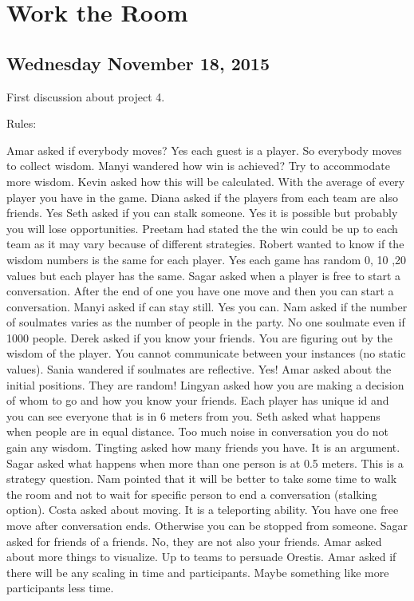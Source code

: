 \section{Work the Room}
\subsection{Wednesday November 18, 2015}
First discussion about project 4.

Rules:

Amar asked if everybody moves? Yes each guest is a player. So everybody moves to 
collect wisdom.
Manyi wandered how win is achieved? Try to accommodate more wisdom.
Kevin asked how this will be calculated. With the average of every player you 
have in the game.
Diana asked if the players from each team are also friends. Yes
Seth asked if you can stalk someone. Yes it is possible but probably you will 
lose opportunities.
Preetam had stated the the win could be up to each team as it may vary because 
of different strategies.
Robert wanted to know if the wisdom numbers is the same for each player. Yes each 
game has random {0, 10 ,20} values but each player has the same.
Sagar asked when a player is free to start a conversation. After the end of one 
you have one move and then you can start a conversation.
Manyi asked if can stay still. Yes you can.
Nam asked if the number of soulmates varies as the number of people in the party. 
No one soulmate even if 1000 people.
Derek asked if you know your friends. You are figuring out by the wisdom of the 
player. You cannot communicate between your instances (no static values). 
Sania wandered if soulmates are reflective. Yes!
Amar asked about the initial positions. They are random!
Lingyan asked how you are making a decision of whom to go and how you know your 
friends.
Each player has unique id and you can see everyone that is in 6 meters from you.
Seth asked what happens when people are in equal distance. Too much noise in 
conversation you do not gain any wisdom. 
Tingting asked how many friends you have. It is an argument.
Sagar asked what happens when more than one person is at 0.5 meters. This is a 
strategy question.
Nam pointed that it will be better to take some time to walk the room and not to 
wait for specific person to end a conversation (stalking option).
Costa asked about moving. It is a teleporting ability. You have one free move 
after conversation ends. Otherwise you can be stopped from someone. 
Sagar asked for friends of a friends. No, they are not also your friends.
Amar asked about more things to visualize. Up to teams to persuade Orestis.
Amar asked if there will be any scaling in time and participants. Maybe something 
like more participants less time.

